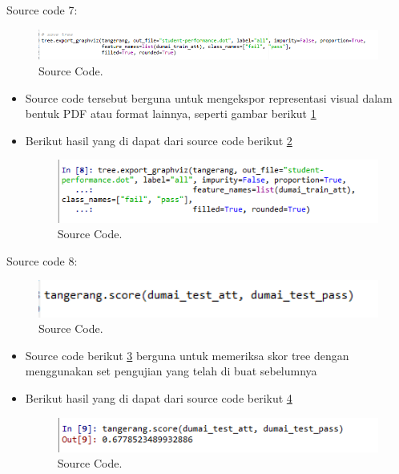 Source code 7:
		\begin{figure}[ht]
		\centerline{\includegraphics[width=1\textwidth]{figures/im/imQ7.png}}
		\caption{Source Code.}
		\label{tujuhQ}
		\end{figure}
\begin{itemize}
\item Source code tersebut berguna untuk mengekspor representasi visual dalam bentuk PDF atau format lainnya, seperti gambar berikut \ref{tujuhQ}
\item Berikut hasil yang di dapat dari source code berikut \ref{tujuhC}
		\begin{figure}[ht]
		\centerline{\includegraphics[width=1\textwidth]{figures/im/imCode7.png}}
		\caption{Source Code.}
		\label{tujuhC}
		\end{figure}
\end{itemize}

Source code 8:
		\begin{figure}[ht]
		\centerline{\includegraphics[width=1\textwidth]{figures/im/imQ8.png}}
		\caption{Source Code.}
		\label{delapanQ}
		\end{figure}
\begin{itemize}
\item Source code berikut \ref {delapanQ} berguna untuk memeriksa skor tree dengan menggunakan set pengujian yang telah di buat sebelumnya
\item Berikut hasil yang di dapat dari source code berikut \ref{delapanC}
		\begin{figure}[ht]
		\centerline{\includegraphics[width=1\textwidth]{figures/im/imCode8.png}}
		\caption{Source Code.}
		\label{delapanC}
		\end{figure}
\end{itemize}

